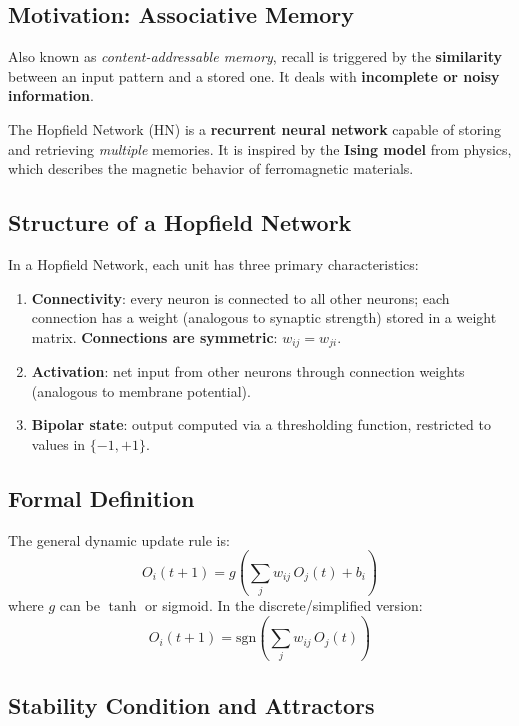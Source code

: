 \documentclass[11pt,a4paper]{article}
\newcommand{\sgn}{\text{sgn}}
\begin{document}
\subsection{Motivation: Associative Memory}

\begin{definitionbox}[title=Associative Memory]
Also known as \emph{content-addressable memory}, recall is triggered by the \textbf{similarity} between an input pattern and a stored one. It deals with \textbf{incomplete or noisy information}.
\end{definitionbox}

The Hopfield Network (HN) is a \textbf{recurrent neural network} capable of storing and retrieving \emph{multiple} memories. It is inspired by the \textbf{Ising model} from physics, which describes the magnetic behavior of ferromagnetic materials.

\subsection{Structure of a Hopfield Network}

In a Hopfield Network, each unit has three primary characteristics:

\begin{enumerate}[leftmargin=*]
    \item \textbf{Connectivity}: every neuron is connected to all other neurons; each connection has a weight (analogous to synaptic strength) stored in a weight matrix. \textbf{Connections are symmetric}: $w_{ij} = w_{ji}$.
    \item \textbf{Activation}: net input from other neurons through connection weights (analogous to membrane potential).
    \item \textbf{Bipolar state}: output computed via a thresholding function, restricted to values in $\{-1, +1\}$.
\end{enumerate}

\subsection{Formal Definition}

The general dynamic update rule is:
\[
O_i(t+1) = g\!\left(\sum_j w_{ij}\, O_j(t) + b_i\right)
\]
where $g$ can be $\tanh$ or sigmoid. In the discrete/simplified version:
\[
O_i(t+1) = \sgn\!\left(\sum_j w_{ij}\, O_j(t)\right)
\]

\subsection{Stability Condition and Attractors}
\end{document}
